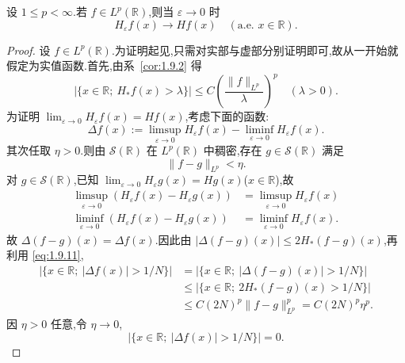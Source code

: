 \begin{corollary}\label{cor:1.9.4}
设 $1 \leq p < \infty$.若 $f \in L^{p}(\mathbb{R})$,则当 $\varepsilon \to 0$ 时
\begin{equation*}
H_{\varepsilon}f(x) \to Hf(x) \quad (\text{a.e. } x \in \mathbb{R}).
\end{equation*}
\end{corollary}

\begin{proof}
设 $f \in L^{p}(\mathbb{R})$.为证明起见,只需对实部与虚部分别证明即可,故从一开始就假定为实值函数.首先,由系~\ref{cor:1.9.2} 得
\begin{equation}\tag{1.9.11}
|\{x \in \mathbb{R};\ H_{*}f(x) > \lambda\}| \leq C\left(\frac{\| f \|_{L^{p}}}{\lambda}\right)^{p} \quad (\lambda > 0).
\label{eq:1.9.11}\end{equation}
为证明 $\lim_{\varepsilon \to 0}H_{\varepsilon}f(x) = Hf(x)$,考虑下面的函数:
\begin{equation*}
\Delta f(x) := \limsup_{\varepsilon \to 0}H_{\varepsilon}f(x) - \liminf_{\varepsilon \to 0}H_{\varepsilon}f(x).
\end{equation*}
其次任取 $\eta > 0$.则由 $\mathcal{S}(\mathbb{R})$ 在 $L^{p}(\mathbb{R})$ 中稠密,存在 $g \in \mathcal{S}(\mathbb{R})$ 满足
\begin{equation*}
\| f - g \|_{L^{p}} < \eta.
\end{equation*}
对 $g \in \mathcal{S}(\mathbb{R})$,已知 $\lim_{\varepsilon \to 0}H_{\varepsilon}g(x) = Hg(x)$($x \in \mathbb{R}$),故
\begin{align*}
\limsup_{\varepsilon \to 0}(H_{\varepsilon}f(x) - H_{\varepsilon}g(x)) &= \limsup_{\varepsilon \to 0}H_{\varepsilon}f(x) \\
\liminf_{\varepsilon \to 0}(H_{\varepsilon}f(x) - H_{\varepsilon}g(x)) &= \liminf_{\varepsilon \to 0}H_{\varepsilon}f(x).
\end{align*}
故 $\Delta(f - g)(x) = \Delta f(x)$.因此由 $|\Delta(f - g)(x)| \leq 2H_{*}(f - g)(x)$,再利用 \eqref{eq:1.9.11},
\begin{align*}
|\{x \in \mathbb{R};\ |\Delta f(x)| > 1/N\}| & = |\{x \in \mathbb{R};\ |\Delta(f - g)(x)| > 1/N\}| \\
& \leq |\{x \in \mathbb{R};\ 2H_{*}(f - g)(x) > 1/N\}| \\
& \leq C(2N)^{p}\| f - g \|_{L^{p}}^{p} = C(2N)^{p}\eta^{p}.
\end{align*}
因 $\eta > 0$ 任意,令 $\eta \to 0$,
\begin{equation*}
|\{x \in \mathbb{R};\ |\Delta f(x)| > 1/N\}| = 0.

\end{equation*}
\end{proof}
